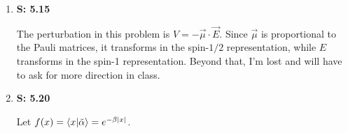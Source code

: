 \documentclass[12pt, letterpaper]{article}
\begin{document}
\begin{enumerate}
\begin{enumerate}[(a)]
\end{enumerate}


\item[] \textbf{S: 5.15}

The perturbation in this problem is $V = -\vec{\mu}\cdot \vec{E}$. Since $\vec{\mu}$ is proportional to the Pauli matrices, it transforms in the spin-$1/2$ representation, while $E$ transforms in the spin-1 representation. Beyond that, I'm lost and will have to ask for more direction in class.
    

    \item[] \textbf{S: 5.20}
    
    Let $f(x)=\braket{x|\tilde{\alpha}}=e^{-\beta|x|}$. 
    

\end{enumerate}
\end{document}
